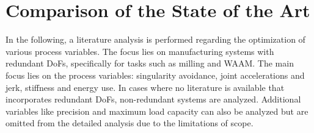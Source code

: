 \section{Comparison of the State of the Art }\label{comp}

In the following, a literature analysis is performed regarding the optimization of various process variables. The focus lies on manufacturing systems with redundant \acrshort{DoF}s, specifically for tasks such as milling and \acrshort{WAAM}. 
The main focus lies on the process variables: singularity avoidance, joint accelerations and jerk, stiffness and energy use.
In cases where no literature is available that incorporates redundant \acrshort{DoF}s, non-redundant systems are analyzed. Additional variables like precision and maximum load capacity can also be analyzed but are omitted from the detailed analysis due to the limitations of scope.

	
	


